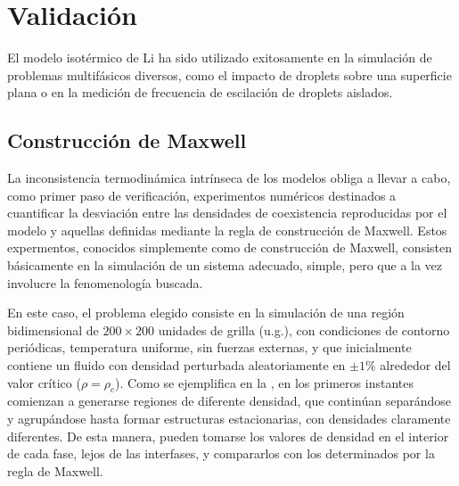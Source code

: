 \section{Validaci\'on}

El modelo isot\'ermico de Li ha sido utilizado exitosamente en la simulaci\'on de problemas multif\'asicos diversos, como el impacto de droplets sobre una superficie plana o en la medici\'on de frecuencia de escilaci\'on de droplets aislados. 

\subsection{Construcci\'on de Maxwell}

La inconsistencia termodin\'amica intr\'inseca de los modelos \pp{} obliga a llevar a cabo, como primer paso de verificaci\'on, experimentos num\'ericos destinados a cuantificar la desviaci\'on entre las densidades de coexistencia reproducidas por el modelo y aquellas definidas mediante la regla de construcci\'on de Maxwell. Estos expermentos, conocidos simplemente como de construcci\'on de Maxwell, consisten b\'asicamente en la simulaci\'on de un sistema adecuado, simple, pero que a la vez involucre la fenomenolog\'ia buscada.

En este caso, el problema elegido consiste en la simulaci\'on de una regi\'on bidimensional de $200 \times 200$ unidades de grilla (u.g.), con condiciones de contorno peri\'odicas, temperatura uniforme, sin fuerzas externas, y que inicialmente contiene un fluido con densidad perturbada aleatoriamente en  $\pm 1\%$ alrededor del valor cr\'itico ($\rho=\rho_c$). Como se ejemplifica en la , en los primeros instantes comienzan a generarse regiones de diferente densidad, que contin\'uan separ\'andose y agrup\'andose hasta formar estructuras estacionarias, con densidades claramente diferentes. De esta manera, pueden tomarse los valores de densidad en el interior de cada fase, lejos de las interfases, y compararlos con los determinados por la regla de Maxwell.

